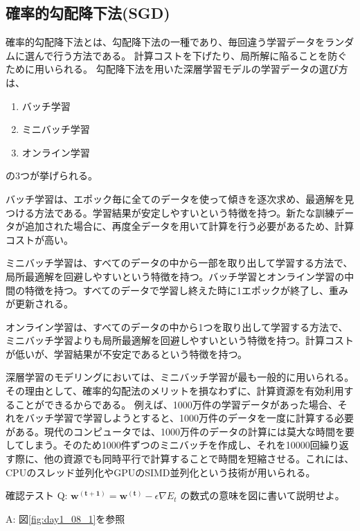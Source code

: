 \documentclass{ltjsarticle}
\begin{document}
\subsection{確率的勾配降下法(SGD)}
確率的勾配降下法とは、勾配降下法の一種であり、毎回違う学習データをランダムに選んで行う方法である。
計算コストを下げたり、局所解に陥ることを防ぐために用いられる。
勾配降下法を用いた深層学習モデルの学習データの選び方は、
\begin{enumerate}
  \item バッチ学習
  \item ミニバッチ学習
  \item オンライン学習
\end{enumerate}
の3つが挙げられる。
\par
バッチ学習は、エポック毎に全てのデータを使って傾きを逐次求め、最適解を見つける方法である。学習結果が安定しやすいという特徴を持つ。新たな訓練データが追加された場合に、再度全データを用いて計算を行う必要があるため、計算コストが高い。
\par
ミニバッチ学習は、すべてのデータの中から一部を取り出して学習する方法で、局所最適解を回避しやすいという特徴を持つ。バッチ学習とオンライン学習の中間の特徴を持つ。すべてのデータで学習し終えた時に1エポックが終了し、重みが更新される。
\par
オンライン学習は、すべてのデータの中から1つを取り出して学習する方法で、ミニバッチ学習よりも局所最適解を回避しやすいという特徴を持つ。計算コストが低いが、学習結果が不安定であるという特徴を持つ。
\par
深層学習のモデリングにおいては、ミニバッチ学習が最も一般的に用いられる。
その理由として、確率的勾配法のメリットを損なわずに、計算資源を有効利用することができるからである。
例えば、1000万件の学習データがあった場合、それをバッチ学習で学習しようとすると、1000万件のデータを一度に計算する必要がある。現代のコンピュータでは、1000万件のデータの計算には莫大な時間を要してしまう。そのため1000件ずつのミニバッチを作成し、それを10000回繰り返す際に、他の資源でも同時平行で計算することで時間を短縮させる。これには、CPUのスレッド並列化やGPUのSIMD並列化という技術が用いられる。

\begin{itembox}[l]{確認テスト}
  Q: $\mathbf{w^{(t+1)}} = \mathbf{w^{(t)}} - \epsilon \nabla E_t$ の数式の意味を図に書いて説明せよ。

  A: 図\ref{fig:day1_08_1}を参照
\end{itembox}
\end{document}
